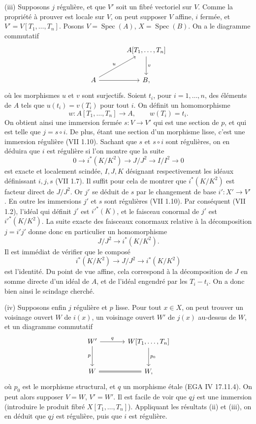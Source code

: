 \documentclass[11pt]{article}
\newcommand{\Spec}{\operatorname{Spec}}
\begin{document}
(iii) Supposons $j$ régulière, et que $V'$ soit un fibré vectoriel sur $V$. Comme la propriété à prouver est locale sur $V$, on peut supposer $V$ affine, $i$ fermée, et $V'=V[T_1,\ldots,T_n]$. Posons $V=\Spec(A)$, $X=\Spec(B)$. On a le diagramme commutatif
\[
\begin{tikzcd}[column sep=large,row sep=large]
& A[T_1,\ldots,T_n] \arrow[d,"v"]\\
A \arrow[r] \arrow[ur,"u"] & B,
\end{tikzcd}
\]
où les morphismes $u$ et $v$ sont surjectifs. Soient $t_i$, pour $i=1,\ldots,n$, des éléments de $A$ tels que $u(t_i)=v(T_i)$ pour tout $i$. On définit un homomorphisme
\[
w:A[T_1,\ldots,T_n]\longrightarrow A,
\qquad w(T_i)=t_i.
\]
On obtient ainsi une immersion fermée $s:V\to V'$ qui est une section de $p$, et qui est telle que $j=s\circ i$. De plus, étant une section d'un morphisme lisse, c'est une immersion régulière (VII 1.10). Sachant que $s$ et $s\circ i$ sont régulières, on en déduira que $i$ est régulière si l'on montre que la suite
\[
0\longrightarrow i^*(K/K^2)\longrightarrow J/J^2\longrightarrow I/I^2\longrightarrow0
\]
est exacte et localement scindée, $I,J,K$ désignant respectivement les idéaux définissant $i,j,s$ (VII 1.7). Il suffit pour cela de montrer que $i^*(K/K^2)$ est facteur direct de $J/J^2$. Or $j'$ se déduit de $s$ par le changement de base $i':X'\to V'$. En outre les immersions $j'$ et $s$ sont régulières (VII 1.10). Par conséquent (VII 1.2), l'idéal qui définit $j'$ est $i'^*(K)$, et le faisceau conormal de $j'$ est $i'^*(K/K^2)$. La suite exacte des faisceaux conormaux relative à la décomposition $j=i'j'$ donne donc en particulier un homomorphisme
\[
J/J^2\longrightarrow i^*(K/K^2).
\]
Il est immédiat de vérifier que le composé
\[
i^*(K/K^2)\longrightarrow J/J^2\longrightarrow i^*(K/K^2)
\]
est l'identité. Du point de vue affine, cela correspond à la décomposition de $J$ en somme directe d'un idéal de $A$, et de l'idéal engendré par les $T_i-t_i$. On a donc bien ainsi le scindage cherché.

(iv) Supposons enfin $j$ régulière et $p$ lisse. Pour tout $x\in X$, on peut trouver un voisinage ouvert $W$ de $i(x)$, un voisinage ouvert $W'$ de $j(x)$ au-dessus de $W$, et un diagramme commutatif
\[
\begin{tikzcd}[column sep=large,row sep=large]
W' \arrow[r,"q"] \arrow[d,"p"'] & W[T_1,\ldots,T_n] \arrow[d,"p_0"]\\
W \arrow[r,equal] & W,
\end{tikzcd}
\]
où $p_0$ est le morphisme structural, et $q$ un morphisme étale (EGA IV 17.11.4). On peut alors supposer $V=W$, $V'=W'$. Il est facile de voir que $qj$ est une immersion (introduire le produit fibré $X[T_1,\ldots,T_n]$). Appliquant les résultats (ii) et (iii), on en déduit que $qj$ est régulière, puis que $i$ est régulière.
\end{document}

